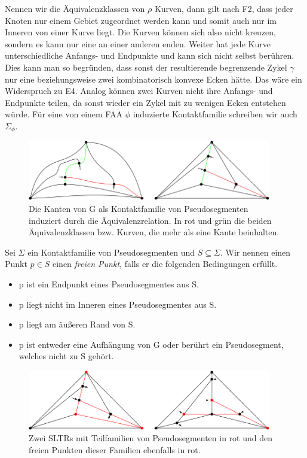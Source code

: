 Nennen wir die Äquivalenzklassen von $\rho$ Kurven, dann gilt nach F2, dass jeder Knoten nur einem Gebiet zugeordnet werden kann und somit auch nur im Inneren von einer Kurve liegt. Die Kurven können sich also nicht kreuzen, sondern es kann nur eine an einer anderen enden. Weiter hat jede Kurve unterschiedliche Anfangs- und Endpunkte und kann sich nicht selbst berühren. Dies kann man so begründen, dass sonst der resultierende begrenzende Zykel $\gamma$ nur eine beziehungsweise zwei kombinatorisch konvexe Ecken hätte. Das wäre ein Widerspruch zu E4. Analog können zwei Kurven nicht ihre Anfangs- und Endpunkte teilen, da sonst wieder ein Zykel mit zu wenigen Ecken entstehen würde. Für eine von einem FAA $\phi$ induzierte Kontaktfamilie schreiben wir auch $\Sigma_{\phi}$. 

\begin{figure}[h]
	\centering
  \includegraphics[width=0.95\textwidth]{pseudo_seg.png}
  \caption{Die Kanten von G als Kontaktfamilie von Pseudosegmenten induziert durch die Äquivalenzrelation. In rot und grün die beiden Äquivalenzklassen bzw. Kurven, die mehr als eine Kante beinhalten.}
\end{figure}

\begin{definition}
Sei $\Sigma$ ein Kontaktfamilie von Pseudosegmenten und $S\subseteq\Sigma$. Wir nennen einen Punkt $p\in S$ einen \textit{freien Punkt}, falls er die folgenden Bedingungen erfüllt.
\begin{itemize}
\item p ist ein Endpunkt eines Pseudosegmentes aus S.
\item p liegt nicht im Inneren eines Pseudosegmentes aus S.
\item p liegt am äußeren Rand von S.
\item p ist entweder eine Aufhängung von G oder berührt ein Pseudosegment, welches nicht zu S gehört.
\end{itemize} 
\end{definition}

\begin{figure}[h]
	\centering
  \includegraphics[width=0.95\textwidth]{exp_free.png}
  \caption{Zwei SLTRs mit Teilfamilien von Pseudosegmenten in rot und den freien Punkten dieser Familien ebenfalls in rot.}
\end{figure}

